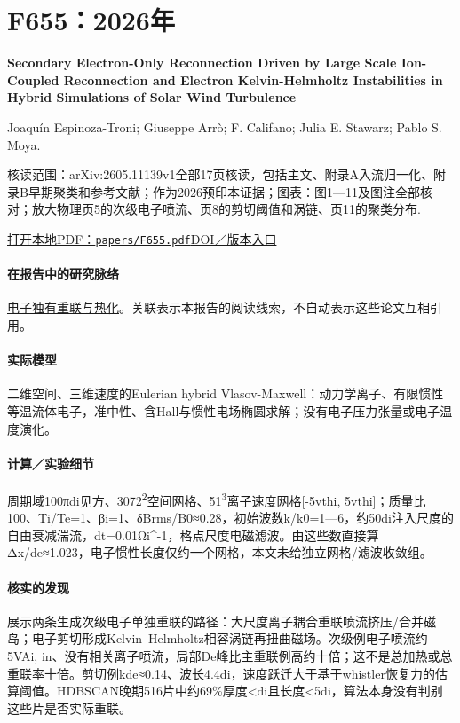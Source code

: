 \documentclass[UTF8,a4paper,11pt,openany,fontset=fandol]{ctexbook}
\begin{document}
\section{F655：2026年}\label{paper:F655}

\textbf{Secondary Electron-Only Reconnection Driven by Large Scale Ion-Coupled Reconnection and Electron Kelvin-Helmholtz Instabilities in Hybrid Simulations of Solar Wind Turbulence}\citep{F655}\

Joaquín Espinoza-Troni;  Giuseppe Arrò;  F. Califano;  Julia E. Stawarz;  Pablo S. Moya.

\textsf{核读范围：}arXiv:2605.11139v1全部17页核读，包括主文、附录A入流归一化、附录B早期聚类和参考文献；作为2026预印本证据；\textsf{图表：}图1—11及图注全部核对；放大物理页5的次级电子喷流、页8的剪切阈值和涡链、页11的聚类分布.

\href{run:../papers/F655.pdf}{打开本地PDF：\texttt{papers/F655.pdf}}\quad\href{https://doi.org/10.48550/arxiv.2605.11139}{DOI／版本入口}

\paragraph{在报告中的研究脉络}\hyperref[story:energy]{电子独有重联与热化}。关联表示本报告的阅读线索，不自动表示这些论文互相引用。

\paragraph{实际模型}二维空间、三维速度的Eulerian hybrid Vlasov-Maxwell：动力学离子、有限惯性等温流体电子，准中性、含Hall与惯性电场椭圆求解；没有电子压力张量或电子温度演化。

\paragraph{计算／实验细节}周期域100πdi见方、3072\textsuperscript{2}空间网格、51\textsuperscript{3}离子速度网格[-5vthi, 5vthi]；质量比100、Ti/Te=1、βi=1、δBrms/B0≈0.28，初始波数k/k0=1—6，约50di注入尺度的自由衰减湍流，dt=0.01Ωi\textasciicircum{}-1，格点尺度电磁滤波。由这些数直接算Δx/de≈1.023，电子惯性长度仅约一个网格，本文未给独立网格/滤波收敛组。

\paragraph{核实的发现}展示两条生成次级电子单独重联的路径：大尺度离子耦合重联喷流挤压/合并磁岛；电子剪切形成Kelvin–Helmholtz相容涡链再扭曲磁场。次级例电子喷流约5VAi, in、没有相关离子喷流，局部De峰比主重联例高约十倍；这不是总加热或总重联率十倍。剪切例kde≈0.14、波长4.4di，速度跃迁大于基于whistler恢复力的估算阈值。HDBSCAN晚期516片中约69\%厚度<di且长度<5di，算法本身没有判别这些片是否实际重联。
\end{document}
